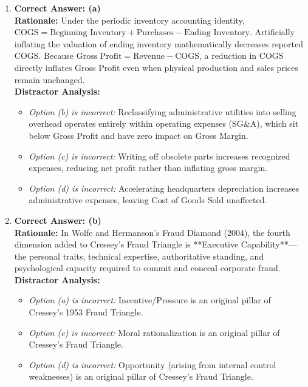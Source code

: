\begin{enumerate}[label=\textbf{MCQ 2.\arabic*}]
    \item \textbf{Correct Answer: (a)}\\
    \textbf{Rationale:} Under the periodic inventory accounting identity, $\text{COGS} = \text{Beginning Inventory} + \text{Purchases} - \text{Ending Inventory}$. Artificially inflating the valuation of ending inventory mathematically decreases reported COGS. Because $\text{Gross Profit} = \text{Revenue} - \text{COGS}$, a reduction in COGS directly inflates Gross Profit even when physical production and sales prices remain unchanged.\\
    \textbf{Distractor Analysis:}
    \begin{itemize}
        \item \textit{Option (b) is incorrect:} Reclassifying administrative utilities into selling overhead operates entirely within operating expenses (SG\&A), which sit below Gross Profit and have zero impact on Gross Margin.
        \item \textit{Option (c) is incorrect:} Writing off obsolete parts increases recognized expenses, reducing net profit rather than inflating gross margin.
        \item \textit{Option (d) is incorrect:} Accelerating headquarters depreciation increases administrative expenses, leaving Cost of Goods Sold unaffected.
    \end{itemize}

    \item \textbf{Correct Answer: (b)}\\
    \textbf{Rationale:} In Wolfe and Hermanson's Fraud Diamond (2004), the fourth dimension added to Cressey's Fraud Triangle is **Executive Capability**---the personal traits, technical expertise, authoritative standing, and psychological capacity required to commit and conceal corporate fraud.\\
    \textbf{Distractor Analysis:}
    \begin{itemize}
        \item \textit{Option (a) is incorrect:} Incentive/Pressure is an original pillar of Cressey's 1953 Fraud Triangle.
        \item \textit{Option (c) is incorrect:} Moral rationalization is an original pillar of Cressey's Fraud Triangle.
        \item \textit{Option (d) is incorrect:} Opportunity (arising from internal control weaknesses) is an original pillar of Cressey's Fraud Triangle.
    \end{itemize}
\end{enumerate}

